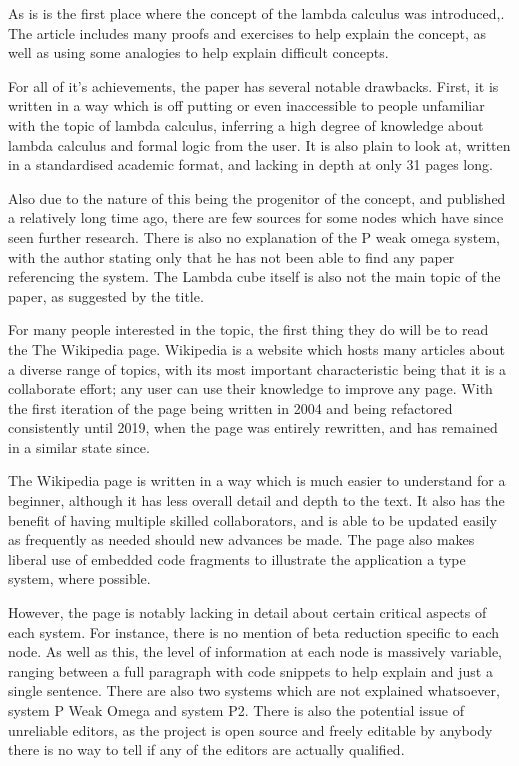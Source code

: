 \documentclass{l4proj}
\begin{document}
As is is the first place where the concept of the lambda calculus was introduced,.  The article includes many proofs and exercises to help explain the concept, as well as using some analogies to help explain difficult concepts.

For all of it's achievements, the paper has several notable drawbacks.  First, it is written in a way which is off putting or even inaccessible to people unfamiliar with the topic of lambda calculus, inferring a high degree of knowledge about lambda calculus and formal logic from the user.  It is also plain to look at, written in a standardised academic format, and lacking in depth at only 31 pages long.

Also due to the nature of this being the progenitor of the concept, and published a relatively long time ago, there are few sources for some nodes which have since seen further research.  There is also no explanation of the P weak omega system, with the author stating only that he has not been able to find any paper referencing the system.  The Lambda cube itself is also not the main topic of the paper, as suggested by the title.

For many people interested in the topic, the first thing they do will be to read the The Wikipedia page.  Wikipedia is a website which hosts many articles about a diverse range of topics, with its most important characteristic being that it is a collaborate effort; any user can use their knowledge to improve any page.  With the first iteration of the page being written in 2004 and being refactored consistently until 2019, when the page was entirely rewritten, and has remained in a similar state since.

The Wikipedia page is written in a way which is much easier to understand for a beginner, although it has less overall detail and depth to the text.  It also has the benefit of having multiple skilled collaborators, and is able to be updated easily as frequently as needed should new advances be made.  The page also makes liberal use of embedded code fragments to illustrate the application a type system, where possible.

However, the page is notably lacking in detail about certain critical aspects of each system.  For instance, there is no mention of beta reduction specific to each node.  As well as this, the level of information at each node is massively variable, ranging between a full paragraph with code snippets to help explain and just a single sentence.  There are also two systems which are not explained whatsoever, system P Weak Omega and system P2.  There is also the potential issue of unreliable editors, as the project is open source and freely editable by anybody there is no way to tell if any of the editors are actually qualified.
\end{document}
